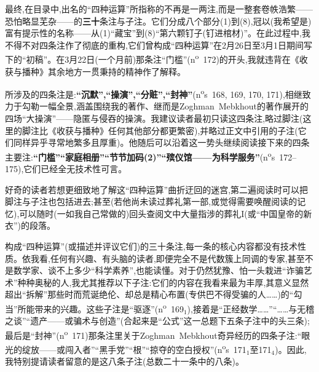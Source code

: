 最终,在目录中,出名的“四种运算”所指称的不再是一两注,而是一整套卷帙浩繁——恐怕略显芜杂——的\textbf{三十}条注与子注。它们分成八个部分(1)到(8),冠以(我希望是)富有提示性的名称——从(1)“藏宝”到(8)“第六颗钉子(钉进棺材)”。在此过程中,我不得不对四条注作了彻底的重构,它们曾构成“四种运算”在2月26日至3月1日期间写下的“初稿”。在3月22日(一个月前)那条注“门槛”(n\textsuperscript{o}~172)的开头,我就违背在《收获与播种》其余地方一贯秉持的精神作了解释。

所涉及的四条注是:\textbf{“沉默”,“操演”,“分赃”,“封神”}(n\textsuperscript{o}s~168, 169, 170, 171),相继致力于勾勒一幅\dmark{}全景,涵盖围绕我的著作、继而是Zoghman~Mebkhout的著作展开的四场“大操演”——隐匿与侵吞的操演。我建议读者最初只读这四条注,略过脚注(这里的脚注比《收获与播种》任何其他部分都更繁密),并略过正文中引用的子注(它们同样异乎寻常地繁多且厚重)。他随后可以沿着这一势头继续阅读接下来的四条主要注:\textbf{“门槛”“家庭相册”“节节加码(2)”“殡仪馆——为科学服务”}(n\textsuperscript{o}s~172--175),它们已经全无技术性可言。

好奇的读者若想更细致地了解这“四种运算”曲折迂回的迷宫,第二遍阅读时可以把脚注与子注也包括进去;甚至(若他尚未读过葬礼第一部,或觉得需要唤醒阅读的记忆),可以随时(一如我自己常做的)回头查阅文中大量指涉的葬礼I(或“中国皇帝的新衣”)的段落。

构成“四种运算”(或描述并评议它们)的三十条注,每一条的核心内容都没有技术性质。依我看,任何有兴趣、有头脑的读者,即便完全不是代数簇上同调的专家,甚至不是数学家、谈不上多少“科学素养”,也能读懂。对于仍然犹豫、怕一头栽进“诈骗艺术”种种奥秘的人,我尤其推荐以下子注:它们的内容在我看来最为丰厚,其意义显然超出“拆解”那些时而荒诞绝伦、却总是精心布置(专供巴不得受骗的人……)的“勾当”所能带来的兴趣。这些子注是“驱逐”(n\textsuperscript{o}~169$_1$),接着是“正经数学……”“……与无稽之谈”“遗产——或骗术与创造”(合起来是“公式”这一总题下五条子注中的头三条);最后是“封神”(n\textsuperscript{o}~171)那条注里关于Zoghman~Mebkhout奇异经历的四条子注:“眼光的绽放——或闯入者”“黑手党”“根”“掠夺的空白授权”(n\textsuperscript{o}s~171$_1$至171$_4$)。因此,我特别提请读者留意的是这八条子注(总数二十一条中的八条)。

